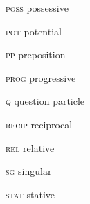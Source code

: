 \begin{multicols}{2}
\textsc{poss} \hfill  possessive  \

\textsc{pot} \hfill  potential \

\textsc{pp} \hfill   preposition \

\textsc{prog} \hfill  progressive  \

\textsc{q}  \hfill  question particle  \

\textsc{recip}  \hfill  reciprocal  \

\textsc{rel} \hfill   relative  \

\textsc{sg} \hfill   singular  \

\textsc{stat} \hfill   stative  \


\end{multicols}
 
 
